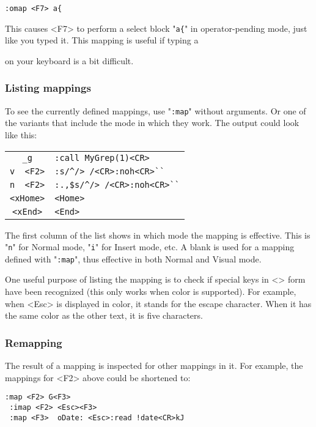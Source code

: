 \begin{Verbatim}[samepage=true]
 :omap <F7> a{
\end{Verbatim}

This causes <F7> to perform a select block "\verb!a{!" in operator-pending mode, just like you typed it.
This mapping is useful if typing a { on your keyboard is a bit difficult.
\subsubsection{Listing mappings}
To see the currently defined mappings, use "\verb!:map!" without arguments.
Or one of the variants that include the mode in which they work.
The output could look like this:

\begin{center} \begin{tabular}{c l}
				\verb!_g! & \verb!:call MyGrep(1)<CR>! \\
				\verb!v  <F2>! & \verb!:s/^/> /<CR>:noh<CR>``! \\
				\verb!n  <F2>! & \verb!:.,$s/^/> /<CR>:noh<CR>``! \\
				\verb!<xHome>! & \verb!<Home>! \\
				\verb!<xEnd>! & \verb!<End>! \\
\end{tabular} \end{center}

The first column of the list shows in which mode the mapping is effective.
This is "\verb!n!" for Normal mode, "\verb!i!" for Insert mode, etc.
A blank is used for a mapping defined with "\verb!:map!", thus effective in both Normal and Visual mode.

One useful purpose of listing the mapping is to check if special keys in <> form have been recognized (this only works when color is supported).
For example, when <Esc> is displayed in color, it stands for the escape character.
When it has the same color as the other text, it is five characters.

\subsubsection{Remapping}
The result of a mapping is inspected for other mappings in it.
For example, the mappings for <F2> above could be shortened to:

\begin{Verbatim}[samepage=true]
 :map <F2> G<F3>
 :imap <F2> <Esc><F3>
 :map <F3>  oDate: <Esc>:read !date<CR>kJ
\end{Verbatim}

}
